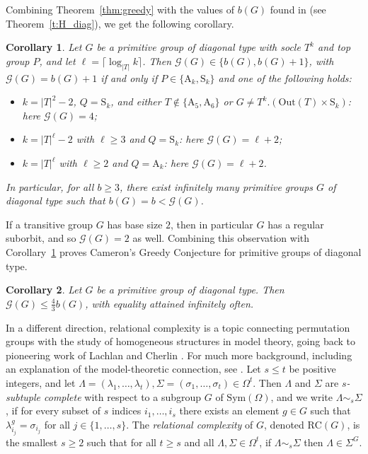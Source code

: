 \documentclass[twoside,a4paper,reqno,11pt]{amsart}
\newcommand{\RC}{\mathrm{RC}}
\newcommand{\<}{\langle}
\renewcommand{\>}{\rangle}
\newcommand{\leqs}{\leqslant}
\newcommand{\geqs}{\geqslant}
\newcommand{\Out}{\mathrm{Out}}
\def\Sym{\mathrm{Sym}}
\newcommand{\Sn}{\mathrm{S}}
\newcommand{\An}{\mathrm{A}}
\newtheorem{corol}{Corollary}
\theoremstyle{definition}
\begin{document}
Combining Theorem~\ref{thm:greedy} with the values of $b(G)$ found in \cite{H_diag} (see Theorem~\ref{t:H_diag}), we get the following corollary.

\begin{corol}\label{corol:GgBg}
    Let $G$ be a primitive group of diagonal type with socle $T^k$ and top group $P$, and let $\ell  = \lceil \log_{|T|} k \rceil$.  Then $\mathcal{G}(G) \in \{b(G),b(G)+1\}$, with $\mathcal{G}(G) = b(G)+1$ if and only if $P\in\{\An_k,\Sn_k\}$ and one of the following holds:
    \vspace{1mm}
		\begin{itemize}\addtolength{\itemsep}{0.2\baselineskip}
			\item[{\rm (a)}]  $k = |T|^2-2$, $Q = \Sn_k$, and either $T\notin\{\An_5,\An_6\}$ or $G\ne T^k.(\Out(T)\times \Sn_k)$: here $\mathcal{G}(G) = 4$;
            \item[{\rm (b)}] $k = |T|^\ell-2$ with $\ell\geqs 3$ and $Q = \Sn_k$: here $\mathcal{G}(G) = \ell+2$;
            \item[{\rm (c)}] $k = |T|^\ell$ with $\ell \geqs 2$ and $Q = \An_k$: here $\mathcal{G}(G) = \ell+2$.
		\end{itemize}
    In particular, for all $b\geqs 3$, there exist infinitely many primitive groups $G$ of diagonal type such that $b(G) = b < \mathcal{G}(G)$.
\end{corol}

If a transitive group $G$ has base size $2$, then in particular $G$ has a regular suborbit, and so $\mathcal{G}(G) = 2$ as well. Combining this observation with Corollary~\ref{corol:GgBg} proves
Cameron's Greedy Conjecture for primitive groups of diagonal type.

\begin{corol}
    Let $G$ be a primitive group of diagonal type. Then $\mathcal{G}(G)\leqs\frac{4}{3}b(G)$, with equality attained infinitely often.
\end{corol}
 
In a different direction, relational complexity is a topic connecting permutation groups with the study of homogeneous structures in model theory, going back to pioneering work of Lachlan and Cherlin \cite{LachlanICM, CherlinGelfand}. 
For much more background, including an explanation of the model-theoretic connection, see \cite{GLS_binary}. Let $s \leqs t$ be positive integers, and let $\Lambda = (\lambda_1, \ldots, \lambda_t), \Sigma = (\sigma_1, \ldots, \sigma_t) \in \Omega^t$. Then $\Lambda$ and $\Sigma$ are \emph{$s$-subtuple complete} with respect to a subgroup $G$ of $\Sym(\Omega)$, and we write $\Lambda \sim_s \Sigma$, if for every subset of $s$ indices $i_1, \ldots, i_s$ there exists an element $g \in G$ such that $\lambda_{i_j}^g = \sigma_{i_j}$ for all $j \in \{1, \ldots, s\}$. The \emph{relational complexity} of $G$, denoted $\RC(G)$, is the smallest $s \geqs 2$ such that for all $t \geqs s$ and all $\Lambda, \Sigma \in \Omega^t$, if $\Lambda \sim_s \Sigma$ then $\Lambda \in \Sigma^G$. 
\end{document}
